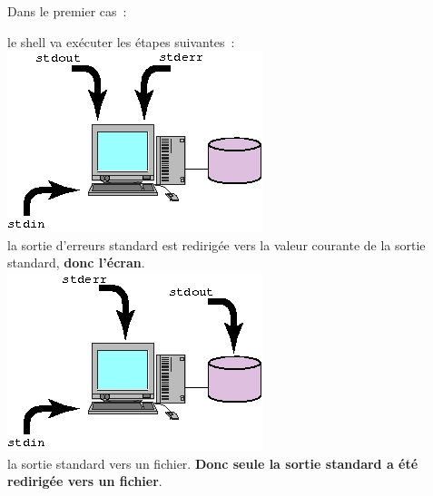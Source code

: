 Dans le premier cas~:
\begin{center}
\end{center}
le shell va ex{\'e}cuter les {\'e}tapes suivantes~:\\[0.5cm]
\includegraphics{./_Images/basic-notions/stdout-stderr-1.jpg}	\\
la sortie d'erreurs standard est redirig{\'e}e vers la valeur courante de la sortie
standard, {\bf donc l'{\'e}cran}.\\[0.5cm]
\includegraphics{./_Images/basic-notions/stdout-stderr-2.jpg} \\
la sortie standard vers un fichier. {\bf Donc seule la sortie standard a
{\'e}t{\'e} redirig{\'e}e vers un fichier}.

